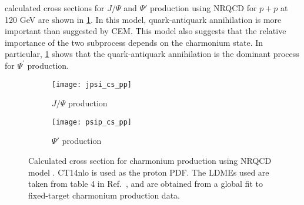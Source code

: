 \documentclass[../main.tex]{subfiles}
\begin{document}
calculated cross sections for $J/\Psi$ and $\Psi'$ production using NRQCD for
$p+p$ at 120 GeV are shown in \cref{fig:NRQCD_cs}. In this model, quark-antiquark
annihilation is more important than suggested by CEM. This model also suggests
that the relative importance of the two subprocess depends on the charmonium state.
In particular, \cref{fig:NRQCD_cs} shows that the quark-antiquark annihilation
is the dominant process for $\Psi^\prime$ production.
\begin{figure}[h!]
	\centering
	\begin{subfigure}{0.45\linewidth}
		\texttt{[image: jpsi\_cs\_pp]}
		\caption{$J/\Psi$ production}
	\end{subfigure}
	\quad
	\begin{subfigure}{0.45\linewidth}
		\texttt{[image: psip\_cs\_pp]}
		\caption{$\Psi'$ production}
	\end{subfigure}
	\caption{Calculated cross section for charmonium production using NRQCD model
		\cite{chang2021}. CT14nlo is used as the proton PDF. The LDMEs used are
		taken from table \num{4} in Ref.~\cite{hsieh2021}, and are obtained from a
		global fit to fixed-target charmonium production data. }
	\label{fig:NRQCD_cs}
\end{figure}


\ifSubfilesClassLoaded{ \printbibliography[heading=bibintoc,title={References}]}{}
\end{document}
